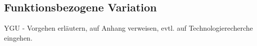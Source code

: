 \subsection{Funktionsbezogene Variation}
YGU - Vorgehen erläutern, auf Anhang verweisen, evtl. auf Technologierecherche eingehen.